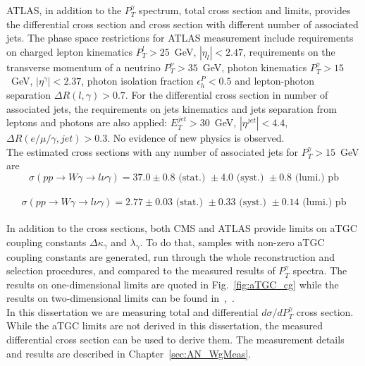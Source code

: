 ATLAS, in addition to the $P_T^\gamma$ spectrum, total cross section and limits, provides the differential cross section and cross section with different number of associated jets. The phase space restrictions for ATLAS measurement include requirements on charged lepton kinematics $P_T^l>25$~GeV, $|\eta_l|<2.47$, requirements on the transverse momentum of a neutrino $P_T^\nu>35$~GeV, photon kinematics $P_T^\gamma>15$~GeV, $|\eta^\gamma|<2.37$, photon isolation fraction $\epsilon^P_h<0.5$ and lepton-photon separation $\Delta R(l,\gamma)>0.7$. For the differential cross section in number of associated jets, the requirements on jets kinematics and jets separation from leptons and photons are also applied: $E_T^{jet}>30$~GeV, $|\eta^{jet}|<4.4$, $\Delta R(e/\mu/\gamma,jet)>0.3$. No evidence of new physics is observed.\\
The estimated cross sections with any number of associated jets for $P_T^\gamma>15$~GeV are \\
\begin{equation}
\sigma(pp\rightarrow W\gamma\rightarrow l\nu\gamma) = 37.0 \pm 0.8\text{~(stat.)~}\pm 4.0\text{~(syst.)~}\pm 0.8\text{~(lumi.)~pb}
\end{equation}
 \\
\begin{equation}
\sigma(pp\rightarrow W\gamma\rightarrow l\nu\gamma) = 2.77 \pm 0.03\text{~(stat.)~}\pm 0.33\text{~(syst.)~}\pm 0.14\text{~(lumi.)~pb}
\end{equation}
\\
In addition to the cross sections, both CMS and ATLAS provide limits on aTGC coupling constants $\Delta \kappa_\gamma$ and $\lambda_\gamma$. To do that, samples with non-zero aTGC coupling constants are generated, run through the whole reconstruction and selection procedures, and compared to the measured results of $P_T^\gamma$ spectra. The results on one-dimensional limits are quoted in Fig.~\ref{fig:aTGC_cg} while the results on two-dimensional limits can be found in~\cite{ref_7TeV_ATLAS},~\cite{ref_7TeV_CMS}.\\
In this dissertation we are measuring total and differential $d\sigma/d P_T^\gamma$ cross section. While the aTGC limits are not derived in this dissertation, the measured differential cross section can be used to derive them. The measurement details and results are described in Chapter~\ref{sec:AN_WgMeas}.\\
